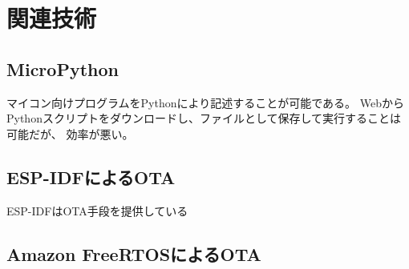 \chapter{関連技術}
\label{chap:related_works}

\section{MicroPython}

マイコン向けプログラムをPythonにより記述することが可能である\cite{micropython}。
WebからPythonスクリプトをダウンロードし、ファイルとして保存して実行することは可能だが、
効率が悪い。

\section{ESP-IDFによるOTA}

ESP-IDFはOTA手段を提供している\cite{esp_ota}

\section{Amazon FreeRTOSによるOTA}
